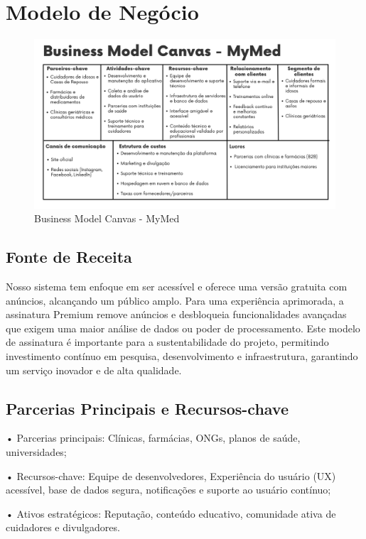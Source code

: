 \section{Modelo de Negócio}
\begin{figure}[!htbp]
    \centering
    \includegraphics[width=0.75\linewidth]{assets/figuras/BMC.png}
    \caption{Business Model Canvas - MyMed}
\end{figure}

\subsection*{Fonte de Receita}
Nosso sistema tem enfoque em ser acessível e oferece uma versão gratuita com anúncios, alcançando um público amplo. Para uma experiência aprimorada, a assinatura Premium remove anúncios e desbloqueia funcionalidades avançadas que exigem uma maior análise de dados ou poder de processamento. Este modelo de assinatura é importante para a sustentabilidade do projeto, permitindo investimento contínuo em pesquisa, desenvolvimento e infraestrutura, garantindo um serviço inovador e de alta qualidade.

\subsection*{Parcerias Principais e Recursos-chave}
• Parcerias principais: Clínicas, farmácias, ONGs, planos de saúde, universidades;

• Recursos-chave: Equipe de desenvolvedores, Experiência do usuário (UX) acessível, base de dados segura, notificações e suporte ao usuário contínuo;

• Ativos estratégicos: Reputação, conteúdo educativo, comunidade ativa de cuidadores e divulgadores.

